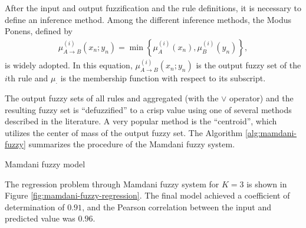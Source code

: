 \documentclass[english]{sobraep}
\begin{document}
After the input and output fuzzification and the rule definitions, it is necessary to define an inference method. Among the different inference methods, the Modus Ponens, defined by
\begin{align}
    \mu_{A\rightarrow B}^{(i)} (x_n;y_n) = \min\left\{  \mu_A^{(i)}(x_n), \mu_B^{(i)} (y_n) \right\},
\end{align}
is widely adopted. In this equation, \(\mu_{A\rightarrow B}^{(i)} (x_n;y_n)\) is the output fuzzy set of the \(i\)th rule and \(\mu_\cdot\) is the membership function with respect to its subscript.

The output fuzzy sets of all rules and aggregated (with the \(\vee\) operator) and the resulting fuzzy set is ``defuzzified'' to a crisp value using one of several methods described in the literature. A very popular method is the ``centroid'', which utilizes the center of mass of the output fuzzy set. The Algorithm \ref{alg:mamdani-fuzzy} summarizes the procedure of the Mamdani fuzzy system.

\begin{algorithm}[!ht]
    \DontPrintSemicolon
      
    
    \caption{Mamdani fuzzy model}
    \label{alg:mamdani-fuzzy}
\end{algorithm}

The regression problem through Mamdani fuzzy system for \(K=3\) is shown in Figure \ref{fig:mamdani-fuzzy-regression}. The final model achieved a coefficient of determination of \(0.91\), and the Pearson correlation between the input and predicted value was \(0.96\).
\end{document}
